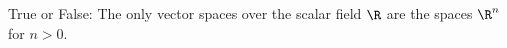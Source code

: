 



\endedxtext



True or False: The only vector spaces over the scalar field $\R$ are the spaces
$\R^n$ for $n> 0$.  


\edXsolution{  }

\endedxproblem


\endedxvertical

